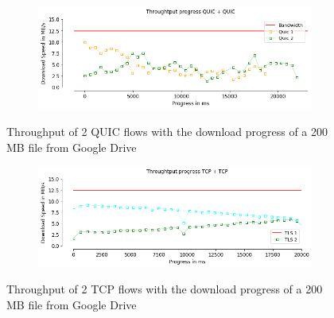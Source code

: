 \begin{frame}

\begin{figure}[!htb]
    \centering
    \begin{subfigure}{0.45\textwidth}
        \includegraphics[width=\linewidth]{./plots/PI/throughput/ThroughtputprogressQUIC+QUIC.png}
    \end{subfigure}
    
    \caption{Throughput of 2 QUIC flows with the download progress of a 200 MB file from Google Drive}\label{fig:throughput-of-2y}
\end{figure}

\begin{figure}[!htb]
    \centering
    \begin{subfigure}{0.45\textwidth}
        \includegraphics[width=\linewidth]{./plots/PI/throughput/ThroughtputprogressTCP+TCP.png}
    \end{subfigure}
    
    \caption{Throughput of 2 TCP flows with the download progress of a 200 MB file from Google Drive}\label{fig:throughput-of-2g}
\end{figure}

\end{frame}
\clearpage

